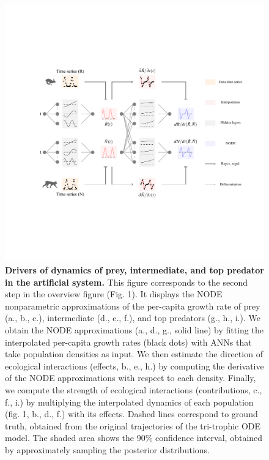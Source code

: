 \documentclass[11pt, oneside]{article}
\begin{document}
\newpage
\begin{figure}[H]
\begin{center}
\includegraphics[width=\linewidth,page=3]{figures/main.pdf}
\caption{
    \textbf{Drivers of dynamics of prey, intermediate, and top predator in the artificial system.}
    This figure corresponds to the second step in the overview figure (Fig. 1).
    It displays the NODE nonparametric approximations of the per-capita growth rate of prey (a., b., c.), intermediate (d., e., f.), and top predators (g., h., i.).
    We obtain the NODE approximations (a., d., g., solid line) by fitting the interpolated per-capita growth rates (black dots) with ANNs that take population densities as input.
    We then estimate the direction of ecological interactions (effects, b., e., h.) by computing the derivative of the NODE approximations with respect to each density.
    Finally, we compute the strength of ecological interactions (contributions, c., f., i.) by multiplying the interpolated dynamics of each population (fig. 1, b., d., f.) with its effects.
    Dashed lines correspond to ground truth, obtained from the original trajectories of the tri-trophic ODE model. 
    The shaded area shows the 90\% confidence interval, obtained by approximately sampling the posterior distributions. 
}
\end{center}
\end{figure}
\newpage
\end{document}
